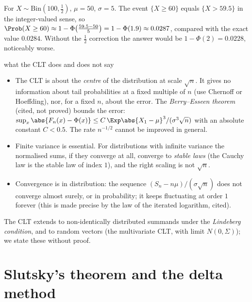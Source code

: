 \begin{example}
For $X\sim\mathrm{Bin}(100,\tfrac12)$, $\mu=50$, $\sigma=5$. The event $\{X\ge60\}$
equals $\{X>59.5\}$ in the integer-valued sense, so
$\Prob(X\ge60)\approx1-\Phi\bigl(\tfrac{59.5-50}5\bigr)=1-\Phi(1.9)\approx0.0287$,
compared with the exact value $0.0284$. Without the $\tfrac12$ correction the answer
would be $1-\Phi(2)=0.0228$, noticeably worse.
\end{example}

\begin{nuance}{what the CLT does and does not say}
\begin{itemize}
\item The CLT is about the \emph{centre} of the distribution at scale $\sqrt n$. It
gives no information about tail probabilities at a fixed multiple of $n$ (use
Chernoff or Hoeffding), nor, for a fixed $n$, about the error. The
\emph{Berry--Esseen theorem} (cited, not proved) bounds the error:
$\sup_x\abs{F_n(x)-\Phi(x)}\le C\,\Exp\abs{X_1-\mu}^3/(\sigma^3\sqrt n)$ with
an absolute constant $C<0.5$. The rate $n^{-1/2}$ cannot be improved in general.
\item Finite variance is essential. For distributions with infinite variance the
normalised sums, if they converge at all, converge to \emph{stable laws} (the Cauchy
law is the stable law of index $1$), and the right scaling is not $\sqrt n$.
\item Convergence is in distribution: the sequence $(S_n-n\mu)/(\sigma\sqrt n)$ does
not converge almost surely, or in probability; it keeps fluctuating at order $1$
forever (this is made precise by the law of the iterated logarithm, cited).
\end{itemize}
\end{nuance}

The CLT extends to non-identically distributed summands under the \emph{Lindeberg
condition}, and to random vectors (the multivariate CLT, with limit
$N(0,\Sigma)$); we state these without proof.

\section{Slutsky's theorem and the delta method}

